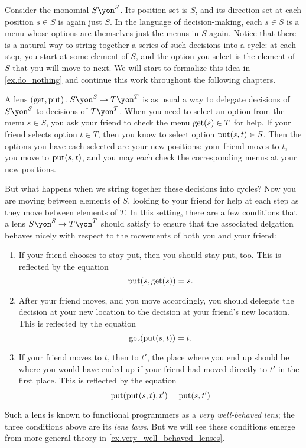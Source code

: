 \documentclass[Book-Poly]{subfiles}
\begin{document}
\begin{example} \label{ex.lens_get_put}
Consider the monomial $S\yon^S$.
Its position-set is $S$, and its direction-set at each position $s\in S$ is again just $S$.
In the language of decision-making, each $s \in S$ is a menu whose options are themselves just the menus in $S$ again.
Notice that there is a natural way to string together a series of such decisions into a cycle: at each step, you start at some element of $S$, and the option you select is the element of $S$ that you will move to next.
We will start to formalize this idea in \cref{ex.do_nothing} and continue this work throughout the following chapters.

A lens $(\lensget,\lensput)\colon S\yon^S\to T\yon^T$ is as usual a way to delegate decisions of $S\yon^S$ to decisions of $T\yon^T$.
When you need to select an option from the menu $s \in S$, you ask your friend to check the menu $\mathrm{get}(s) \in T$ for help.
If your friend selects option $t \in T$, then you know to select option $\mathrm{put}(s, t) \in S$.
Then the options you have each selected are your new positions: your friend moves to $t$, you move to $\mathrm{put}(s, t)$, and you may each check the corresponding menus at your new positions.

But what happens when we string together these decisions into cycles?
Now you are moving between elements of $S$, looking to your friend for help at each step as they move between elements of $T$.
In this setting, there are a few conditions that a lens $S\yon^S \to T\yon^T$ should satisfy to ensure that the associated delgation behaves nicely with respect to the movements of both you and your friend:
\begin{enumerate}
    \item If your friend chooses to stay put, then you should stay put, too.
    This is reflected by the equation
    \[
        \mathrm{put}(s,\mathrm{get}(s))=s.
    \]

    \item After your friend moves, and you move accordingly, you should delegate the decision at your new location to the decision at your friend's new location.
    This is reflected by the equation
    \[
        \mathrm{get}(\mathrm{put}(s,t))=t.
    \]

    \item If your friend moves to $t$, then to $t'$, the place where you end up should be where you would have ended up if your friend had moved directly to $t'$ in the first place.
    This is reflected by the equation
    \[
        \mathrm{put}(\mathrm{put}(s,t),t')=\mathrm{put}(s,t')
    \]
\end{enumerate}
Such a lens is known to functional programmers as a \emph{very well-behaved lens}; the three conditions above are its \emph{lens laws}.
But we will see these conditions emerge from more general theory in \cref{ex.very_well_behaved_lenses}.
\end{example}
\end{document}
